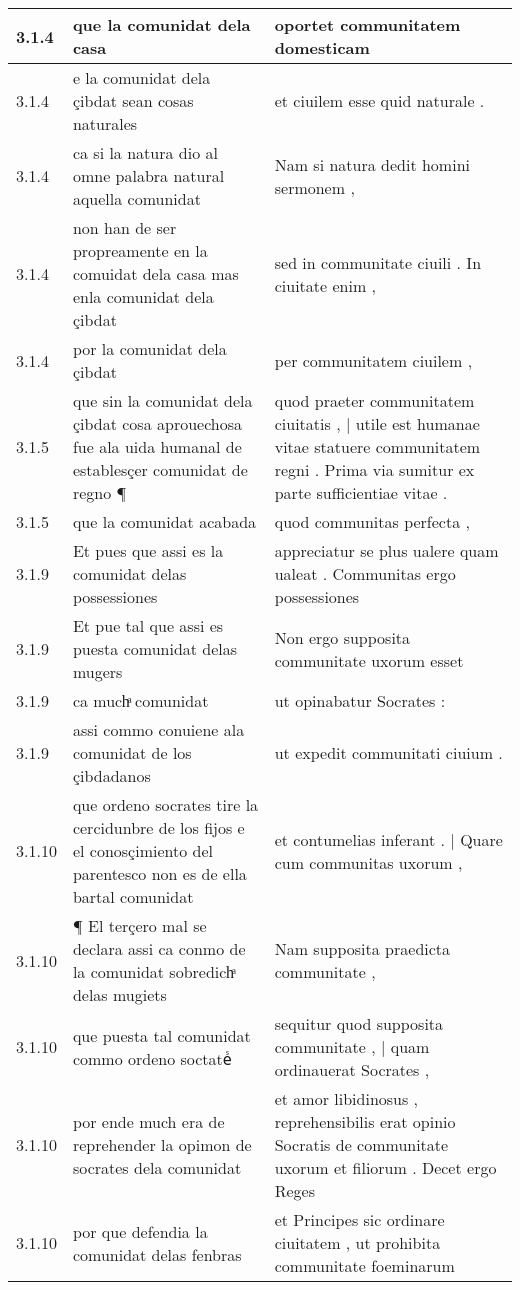 \begin{tabular}{|p{1cm}|p{6.5cm}|p{6.5cm}|}
3.1.4 & que la comunidat dela casa & oportet communitatem domesticam \\\hline
3.1.4 & e la comunidat dela çibdat sean cosas naturales & et ciuilem esse quid naturale . \\\hline
3.1.4 & ca si la natura dio al omne palabra natural aquella comunidat & Nam si natura dedit homini sermonem , \\\hline
3.1.4 & non han de ser propreamente en la comuidat dela casa mas enla comunidat dela çibdat & sed in communitate ciuili . In ciuitate enim , \\\hline
3.1.4 & por la comunidat dela çibdat & per communitatem ciuilem , \\\hline
3.1.5 & que sin la comunidat dela çibdat cosa aprouechosa fue ala uida humanal de establesçer comunidat de regno ¶ & quod praeter communitatem ciuitatis , | utile est humanae vitae statuere communitatem regni . Prima via sumitur ex parte sufficientiae vitae . \\\hline
3.1.5 & que la comunidat acabada & quod communitas perfecta , \\\hline
3.1.9 & Et pues que assi es la comunidat delas possessiones & appreciatur se plus ualere quam ualeat . Communitas ergo possessiones \\\hline
3.1.9 & Et pue tal que assi es puesta comunidat delas mugers & Non ergo supposita communitate uxorum esset \\\hline
3.1.9 & ca muchͣ comunidat & ut opinabatur Socrates : \\\hline
3.1.9 & assi commo conuiene ala comunidat de los çibdadanos & ut expedit communitati ciuium . \\\hline
3.1.10 & que ordeno socrates tire la cercidunbre de los fijos e el conosçimiento del parentesco non es de ella bartal comunidat & et contumelias inferant . | Quare cum communitas uxorum , \\\hline
3.1.10 & ¶ El terçero mal se declara assi ca conmo de la comunidat sobredichͣ delas mugiets & Nam supposita praedicta communitate , \\\hline
3.1.10 & que puesta tal comunidat commo ordeno soctateᷤ & sequitur quod supposita communitate , | quam ordinauerat Socrates , \\\hline
3.1.10 & por ende much era de reprehender la opimon de socrates dela comunidat & et amor libidinosus , reprehensibilis erat opinio Socratis de communitate uxorum et filiorum . Decet ergo Reges \\\hline
3.1.10 & por que defendia la comunidat delas fenbras & et Principes sic ordinare ciuitatem , ut prohibita communitate foeminarum \\\hline

\end{tabular}
